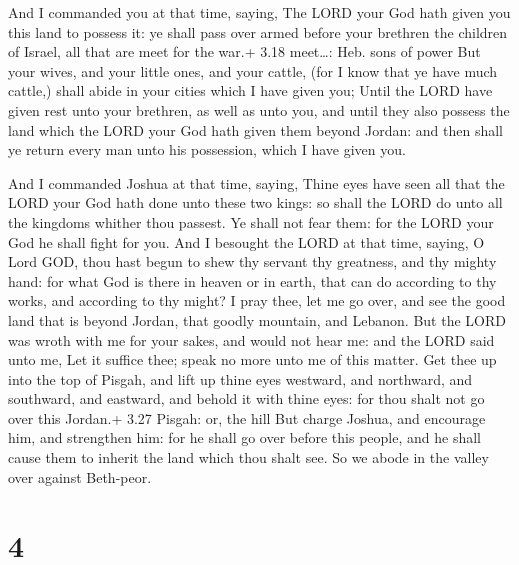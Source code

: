  And I commanded you at that time, saying, The LORD your
God hath given you this land to possess it: ye shall pass over armed
before your brethren the children of Israel, all that are meet for the
war.+ 3.18 meet\ldots: Heb. sons of power  But your wives,
and your little ones, and your cattle, (for I know that ye have much
cattle,) shall abide in your cities which I have given you;
 Until the LORD have given rest unto your brethren, as well
as unto you, and until they also possess the land which the LORD your
God hath given them beyond Jordan: and then shall ye return every man
unto his possession, which I have given you.

 And I commanded Joshua at that time, saying, Thine eyes
have seen all that the LORD your God hath done unto these two kings: so
shall the LORD do unto all the kingdoms whither thou passest.
 Ye shall not fear them: for the LORD your God he shall
fight for you.  And I besought the LORD at that time,
saying,  O Lord GOD, thou hast begun to shew thy servant
thy greatness, and thy mighty hand: for what God is there in heaven or
in earth, that can do according to thy works, and according to thy
might?  I pray thee, let me go over, and see the good land
that is beyond Jordan, that goodly mountain, and Lebanon. 
But the LORD was wroth with me for your sakes, and would not hear me:
and the LORD said unto me, Let it suffice thee; speak no more unto me of
this matter.  Get thee up into the top of Pisgah, and lift
up thine eyes westward, and northward, and southward, and eastward, and
behold it with thine eyes: for thou shalt not go over this Jordan.+ 3.27
Pisgah: or, the hill  But charge Joshua, and encourage him,
and strengthen him: for he shall go over before this people, and he
shall cause them to inherit the land which thou shalt see. 
So we abode in the valley over against Beth-peor.

\hypertarget{section-3}{%
\section{4}\label{section-3}}

